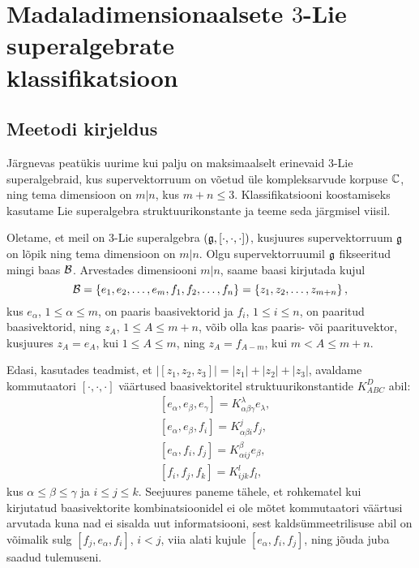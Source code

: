 

\section[Madaladimensionaalsete \texorpdfstring{$3$}{3}-Lie superalgebrate
klassifikatsioon]{Madaladimensionaalsete \texorpdfstring{$3$}{3}-Lie
superalgebrate \\ klassifikatsioon}\label{section:klassifikatsioon}

\subsection{Meetodi kirjeldus}

Järgnevas peatükis uurime kui palju on maksimaalselt erinevaid $3$-Lie
superalgebraid, kus supervektorruum on võetud üle kompleksarvude korpuse $\mathbb{C}$,
ning tema dimensioon on $m|n$, kus $m + n \leq 3$.
Klassifikatsiooni koostamiseks kasutame Lie superalgebra struktuurikonstante
ja teeme seda järgmisel viisil.

Oletame, et meil on 3-Lie superalgebra $(\mathfrak{g}, [\cdot, \cdot, \cdot])$,
kusjuures supervektorruum $\mathfrak{g}$ on lõpik ning tema dimensioon on $m|n$. Olgu
supervektorruumil $\mathfrak{g}$ fikseeritud mingi baas $\mathcal{B}$. Arvestades dimensiooni
$m|n$, saame baasi kirjutada kujul
\[
    \mathcal{B} = \left\{ e_1, e_2, \dots, e_m, f_1, f_2, \dots, f_n \right\} =
         \left\{ z_1, z_2, \dots, z_{m+n} \right\},
\]
kus $e_\alpha$, $1 \leq \alpha \leq m$, on paaris baasivektorid ja
$f_i$, $1 \leq i \leq n$, on paaritud baasivektorid, ning $z_A$,
$1 \leq A \leq m+n$, võib olla kas paaris- või paarituvektor, kusjuures
$z_A = e_A$, kui $1 \leq A \leq m$, ning $z_A = f_{A-m}$, kui
$m < A \leq m+n$.

Edasi, kasutades teadmist, et $|[z_1, z_2, z_3]| = |z_1| + |z_2| + |z_3|$,
avaldame kommutaatori $[\cdot, \cdot, \cdot]$ väärtused baasivektoritel
struktuurikonstantide $K_{ABC}^D$ abil:
\begin{align*}
    &[e_\alpha, e_\beta, e_\gamma] =
        K_{\alpha \beta \gamma}^\lambda e_\lambda, \\
    &[e_\alpha, e_\beta, f_i] = K_{\alpha \beta i}^j f_j, \\
    &[e_\alpha, f_i, f_j] = K_{\alpha i j}^\beta e_\beta, \\
    &[f_i, f_j, f_k] = K_{i j k}^l f_l,
\end{align*}
kus $\alpha \leq \beta \leq \gamma$ ja $i \leq j \leq  k$.
Seejuures paneme tähele, et rohkematel kui kirjutatud baasivektorite
kombinatsioonidel ei ole mõtet kommutaatori väärtusi arvutada kuna nad ei
sisalda uut informatsiooni, sest kaldsümmeetrilisuse abil on võimalik
sulg $[f_j, e_\alpha, f_i]$, $i < j$, viia alati kujule $[e_\alpha, f_i, f_j]$,
ning jõuda juba saadud tulemuseni.

